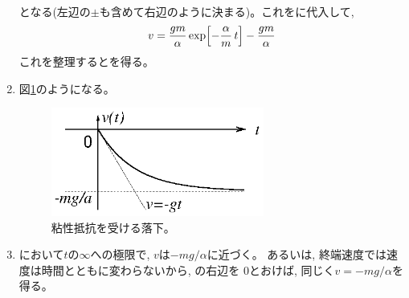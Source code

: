 \begin{enumerate}
\begin{eqnarray}
\end{eqnarray}
となる(左辺の$\pm$も含めて右辺のように決まる)。これをに代入して, 
\begin{eqnarray}
v=\frac{gm}{\alpha}\exp\Bigl[-\frac{\alpha}{m}\,t\Bigr]-\frac{gm}{\alpha}
\end{eqnarray}
これを整理するとを得る。
\item 図\ref{fig:viscos_fall}のようになる。
\begin{figure}[h]
    \centering
    \includegraphics[width=7cm]{viscos_fall.eps}
    \caption{粘性抵抗を受ける落下。}\label{fig:viscos_fall}
\end{figure}
\item {}において$t$の$\infty$への極限で, $v$は$-mg/\alpha$に近づく。
あるいは, 終端速度では速度は時間とともに変わらないから, の右辺を
0とおけば, 同じく$v=-mg/\alpha$を得る。
\end{enumerate}
\vspace{0.2cm}


